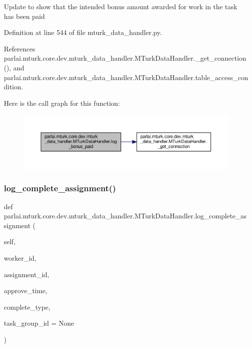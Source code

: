 \begin{DoxyVerb}Update to show that the intended bonus amount awarded for work
in the task has been paid
\end{DoxyVerb}
 

Definition at line 544 of file mturk\+\_\+data\+\_\+handler.\+py.



References parlai.\+mturk.\+core.\+dev.\+mturk\+\_\+data\+\_\+handler.\+M\+Turk\+Data\+Handler.\+\_\+get\+\_\+connection(), and parlai.\+mturk.\+core.\+dev.\+mturk\+\_\+data\+\_\+handler.\+M\+Turk\+Data\+Handler.\+table\+\_\+access\+\_\+condition.

Here is the call graph for this function\+:
\nopagebreak
\begin{figure}[H]
\begin{center}
\leavevmode
\includegraphics[width=350pt]{classparlai_1_1mturk_1_1core_1_1dev_1_1mturk__data__handler_1_1MTurkDataHandler_aaa2ae4ebfd4b668bdef7642cdf4d9392_cgraph}
\end{center}
\end{figure}
\mbox{\label{classparlai_1_1mturk_1_1core_1_1dev_1_1mturk__data__handler_1_1MTurkDataHandler_a07f6dfb250fe119f1fdd44c58e6c05aa}} 
\subsubsection{\texorpdfstring{log\+\_\+complete\+\_\+assignment()}{log\_complete\_assignment()}}
{\footnotesize\ttfamily def parlai.\+mturk.\+core.\+dev.\+mturk\+\_\+data\+\_\+handler.\+M\+Turk\+Data\+Handler.\+log\+\_\+complete\+\_\+assignment (\begin{DoxyParamCaption}\item[{}]{self,  }\item[{}]{worker\+\_\+id,  }\item[{}]{assignment\+\_\+id,  }\item[{}]{approve\+\_\+time,  }\item[{}]{complete\+\_\+type,  }\item[{}]{task\+\_\+group\+\_\+id = {\ttfamily None} }\end{DoxyParamCaption})}


